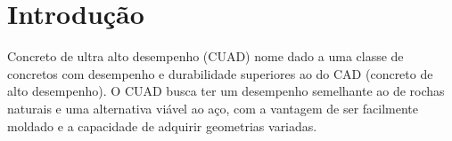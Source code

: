 \documentclass[
	12pt,				%
	openright,			%
	oneside,			%
	a4paper,			%
	chapter=TITLE,		%
	english,			%
	french,				%
	spanish,			%
	brazil				%
	]{abntex2}
\renewcommand{\nomname}{\listadesiglasname}
\begin{document}
\listoftables*
\cleardoublepage


\pdfbookmark[0]{\nomname}{las}
\printnomenclature[3cm]
\cleardoublepage


\tableofcontents*
\cleardoublepage



\textual

\setcounter{page}{1}

\chapter{Introdução}

Concreto de ultra alto desempenho (CUAD) nome dado a uma classe de concretos com desempenho e durabilidade superiores ao do CAD (concreto de alto desempenho). O CUAD busca ter um desempenho semelhante ao de rochas naturais e uma alternativa viável ao aço, com a vantagem de ser facilmente moldado e a capacidade de adquirir geometrias variadas.
\end{document}

